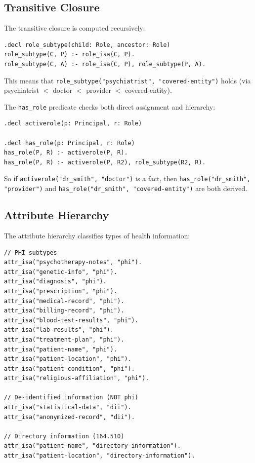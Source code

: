 \documentclass[11pt,letterpaper]{article}
\begin{document}
\subsection{Transitive Closure}

The transitive closure is computed recursively:

\begin{lstlisting}[style=soufflestyle,caption={Transitive closure for roles}]
.decl role_subtype(child: Role, ancestor: Role)
role_subtype(C, P) :- role_isa(C, P).
role_subtype(C, A) :- role_isa(C, P), role_subtype(P, A).
\end{lstlisting}

This means that \texttt{role\_subtype("psychiatrist", "covered-entity")} holds (via psychiatrist $<$ doctor $<$ provider $<$ covered-entity).

The \texttt{has\_role} predicate checks both direct assignment and hierarchy:

\begin{lstlisting}[style=soufflestyle,caption={has\_role uses both direct and inherited roles}]
.decl activerole(p: Principal, r: Role)

.decl has_role(p: Principal, r: Role)
has_role(P, R) :- activerole(P, R).
has_role(P, R) :- activerole(P, R2), role_subtype(R2, R).
\end{lstlisting}

So if \texttt{activerole("dr\_smith", "doctor")} is a fact, then \texttt{has\_role("dr\_smith", "provider")} and \texttt{has\_role("dr\_smith", "covered-entity")} are both derived.

\subsection{Attribute Hierarchy}

The attribute hierarchy classifies types of health information:

\begin{lstlisting}[style=soufflestyle,caption={Attribute hierarchy (selected entries)}]
// PHI subtypes
attr_isa("psychotherapy-notes", "phi").
attr_isa("genetic-info", "phi").
attr_isa("diagnosis", "phi").
attr_isa("prescription", "phi").
attr_isa("medical-record", "phi").
attr_isa("billing-record", "phi").
attr_isa("blood-test-results", "phi").
attr_isa("lab-results", "phi").
attr_isa("treatment-plan", "phi").
attr_isa("patient-name", "phi").
attr_isa("patient-location", "phi").
attr_isa("patient-condition", "phi").
attr_isa("religious-affiliation", "phi").

// De-identified information (NOT phi)
attr_isa("statistical-data", "dii").
attr_isa("anonymized-record", "dii").

// Directory information (164.510)
attr_isa("patient-name", "directory-information").
attr_isa("patient-location", "directory-information").
\end{lstlisting}
\end{document}
